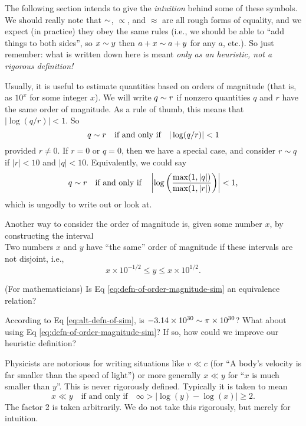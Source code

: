 \begin{ddanger}
The following section intends to give the \emph{intuition} behind some
of these symbols. We should really note that $\sim$, $\propto$, and
$\approx$ are all rough forms of equality, and we expect (in practice)
they obey the same rules (i.e., we should be able to ``add things to
both sides'', so $x\sim y$ then $a+x\sim a+y$ for any $a$, etc.). So
just remember: what is written down here is meant
\emph{only as an heuristic, not a rigorous definition!}
\end{ddanger}

Usually, it is useful to estimate quantities based on orders of
magnitude (that is, as $10^{x}$ for some integer $x$). We will write
$q\sim r$ if nonzero quantities $q$ and $r$ have the same order of
magnitude. As a rule of thumb, this means that $|\log(q/r)|< 1$. So
\begin{equation}\label{eq:defn-of-order-magnitude-sim}
q\sim r\quad\mbox{if and only if}\quad |\log(q/r)|< 1
\end{equation}
provided $r\neq0$. If $r=0$ or $q=0$, then we have a special case, and
consider $r\sim q$ if $|r|<10$ and $|q|<10$. Equivalently, we could say
\begin{equation}\label{eq:alt-defn-of-sim}
q\sim r\quad\mbox{if and only if}\quad \left|\log\left(\frac{\max(1,
|q|)}{\max(1, |r|)}\right)\right| < 1,
\end{equation}
which is ungodly to write out or look at.

Another way to consider the order of magnitude is, given some number
$x$, by constructing the interval
\begin{equation}
[x\times 10^{-1/2}, x\times 10^{1/2}]
\end{equation}
Two numbers $x$ and $y$ have ``the same'' order of magnitude if these
intervals are not disjoint, i.e.,
\begin{equation}
x\times 10^{-1/2}\leq y\leq x\times 10^{1/2}.
\end{equation}

 (For mathematicians) Is Eq \eqref{eq:defn-of-order-magnitude-sim}
an equivalence relation?

 According to Eq \eqref{eq:alt-defn-of-sim}, is
$-3.14\times10^{30}\sim\pi\times10^{30}$? What about using Eq \eqref{eq:defn-of-order-magnitude-sim}?
If so, how could we improve our heuristic definition?

Physicists are notorious for writing situations like $v\ll c$ (for ``A
body's velocity is far smaller than the speed of light'') or more
generally $x\ll y$ for ``$x$ is much smaller than $y$''. This is never
rigorously defined. Typically it is taken to mean
\begin{equation}
x\ll y\quad\mbox{if and only if}\quad \infty>|\log(y)-\log(x)|\geq2.
\end{equation}
The factor 2 is taken arbitrarily. We do not take this rigorously, but
merely for intuition.


